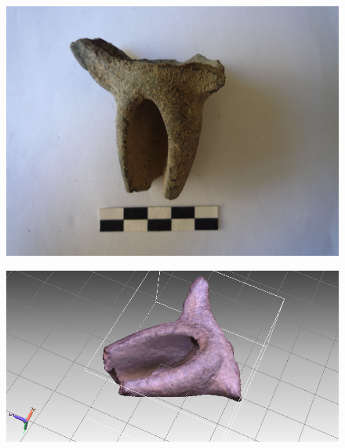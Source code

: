 \documentclass{beamer}
\begin{document}
		\begin{frame}
			\begin{multicols}{2}[][]
				\begin{figure}[]
					\begin{center}
						\includegraphics[width=1\linewidth,trim=50 0 250 0,clip=true]{snap3d/lucerna1}
					\end{center}
					\label{fig:lucerna1}
				\end{figure}
				\begin{figure}[]
					\begin{center}
						\includegraphics[width=1\linewidth,trim=50 0 50 0,clip=true]{snap3d/lucerna2}
					\end{center}
					\label{fig:lucerna2}
				\end{figure}
			\end{multicols}
		\end{frame}
\end{document}
